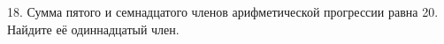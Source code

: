 18. Сумма пятого и семнадцатого членов арифметической прогрессии равна 20. Найдите её одиннадцатый член.\\
